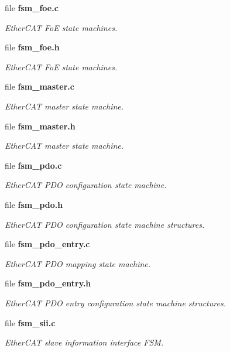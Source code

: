 \begin{DoxyCompactItemize}
file {\bf fsm\-\_\-foe.\-c}
\begin{DoxyCompactList}\small\item\em Ether\-C\-A\-T Fo\-E state machines. \end{DoxyCompactList}\item 
file {\bf fsm\-\_\-foe.\-h}
\begin{DoxyCompactList}\small\item\em Ether\-C\-A\-T Fo\-E state machines. \end{DoxyCompactList}\item 
file {\bf fsm\-\_\-master.\-c}
\begin{DoxyCompactList}\small\item\em Ether\-C\-A\-T master state machine. \end{DoxyCompactList}\item 
file {\bf fsm\-\_\-master.\-h}
\begin{DoxyCompactList}\small\item\em Ether\-C\-A\-T master state machine. \end{DoxyCompactList}\item 
file {\bf fsm\-\_\-pdo.\-c}
\begin{DoxyCompactList}\small\item\em Ether\-C\-A\-T P\-D\-O configuration state machine. \end{DoxyCompactList}\item 
file {\bf fsm\-\_\-pdo.\-h}
\begin{DoxyCompactList}\small\item\em Ether\-C\-A\-T P\-D\-O configuration state machine structures. \end{DoxyCompactList}\item 
file {\bf fsm\-\_\-pdo\-\_\-entry.\-c}
\begin{DoxyCompactList}\small\item\em Ether\-C\-A\-T P\-D\-O mapping state machine. \end{DoxyCompactList}\item 
file {\bf fsm\-\_\-pdo\-\_\-entry.\-h}
\begin{DoxyCompactList}\small\item\em Ether\-C\-A\-T P\-D\-O entry configuration state machine structures. \end{DoxyCompactList}\item 
file {\bf fsm\-\_\-sii.\-c}
\begin{DoxyCompactList}\small\item\em Ether\-C\-A\-T slave information interface F\-S\-M. \end{DoxyCompactList}\item 

\end{DoxyCompactItemize}
